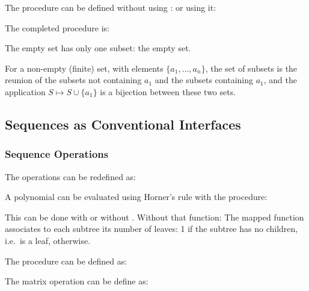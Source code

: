 \begin{exe}[2.31]
    The procedure  can be defined without using :
    or using it:
\end{exe}

\begin{exe}[2.32]
    The completed procedure is:

    The empty set has only one subset: the empty set.

    For a non-empty (finite) set, with elements $\{a_1, …, a_n\}$, the set of 
    subsets is the reunion of the subsets not containing $a_1$ and the subsets 
    containing $a_1$, and the application $S \mapsto S \cup \{a_1\}$ is 
    a bijection between these two sets.
\end{exe}

\subsection{Sequences as Conventional Interfaces}

\subsubsection{Sequence Operations}

\begin{exe}[2.33]
    The operations can be redefined as:
\end{exe}

\begin{exe}[2.34]
    A polynomial can be evaluated using Horner’s rule with the procedure:
\end{exe}

\begin{exe}[2.35]
    This can be done with or without . Without that function:
    The mapped function associates to each subtree its number of leaves: 1 if 
    the subtree has no children, i.e.\ is a leaf,  
    otherwise.
\end{exe}

\begin{exe}[2.36]
    The procedure  can be defined as:
\end{exe}

\begin{exe}[2.37]
    The matrix operation can be define as:
\end{exe}

